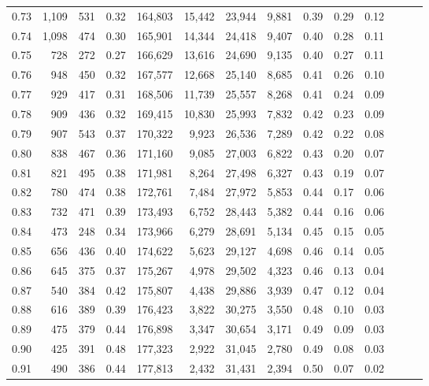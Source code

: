 \begin{tabular}{rrrrrrrrrrrrrr}
0.73 &  1,109 &  531 &  0.32 &  164,803 &   15,442 &  23,944 &   9,881 &  0.39 &  0.29 &      0.12 \\
0.74 &  1,098 &  474 &  0.30 &  165,901 &   14,344 &  24,418 &   9,407 &  0.40 &  0.28 &      0.11 \\
0.75 &    728 &  272 &  0.27 &  166,629 &   13,616 &  24,690 &   9,135 &  0.40 &  0.27 &      0.11 \\
0.76 &    948 &  450 &  0.32 &  167,577 &   12,668 &  25,140 &   8,685 &  0.41 &  0.26 &      0.10 \\
0.77 &    929 &  417 &  0.31 &  168,506 &   11,739 &  25,557 &   8,268 &  0.41 &  0.24 &      0.09 \\
0.78 &    909 &  436 &  0.32 &  169,415 &   10,830 &  25,993 &   7,832 &  0.42 &  0.23 &      0.09 \\
0.79 &    907 &  543 &  0.37 &  170,322 &    9,923 &  26,536 &   7,289 &  0.42 &  0.22 &      0.08 \\
0.80 &    838 &  467 &  0.36 &  171,160 &    9,085 &  27,003 &   6,822 &  0.43 &  0.20 &      0.07 \\
0.81 &    821 &  495 &  0.38 &  171,981 &    8,264 &  27,498 &   6,327 &  0.43 &  0.19 &      0.07 \\
0.82 &    780 &  474 &  0.38 &  172,761 &    7,484 &  27,972 &   5,853 &  0.44 &  0.17 &      0.06 \\
0.83 &    732 &  471 &  0.39 &  173,493 &    6,752 &  28,443 &   5,382 &  0.44 &  0.16 &      0.06 \\
0.84 &    473 &  248 &  0.34 &  173,966 &    6,279 &  28,691 &   5,134 &  0.45 &  0.15 &      0.05 \\
0.85 &    656 &  436 &  0.40 &  174,622 &    5,623 &  29,127 &   4,698 &  0.46 &  0.14 &      0.05 \\
0.86 &    645 &  375 &  0.37 &  175,267 &    4,978 &  29,502 &   4,323 &  0.46 &  0.13 &      0.04 \\
0.87 &    540 &  384 &  0.42 &  175,807 &    4,438 &  29,886 &   3,939 &  0.47 &  0.12 &      0.04 \\
0.88 &    616 &  389 &  0.39 &  176,423 &    3,822 &  30,275 &   3,550 &  0.48 &  0.10 &      0.03 \\
0.89 &    475 &  379 &  0.44 &  176,898 &    3,347 &  30,654 &   3,171 &  0.49 &  0.09 &      0.03 \\
0.90 &    425 &  391 &  0.48 &  177,323 &    2,922 &  31,045 &   2,780 &  0.49 &  0.08 &      0.03 \\
0.91 &    490 &  386 &  0.44 &  177,813 &    2,432 &  31,431 &   2,394 &  0.50 &  0.07 &      0.02 \\

\end{tabular}
